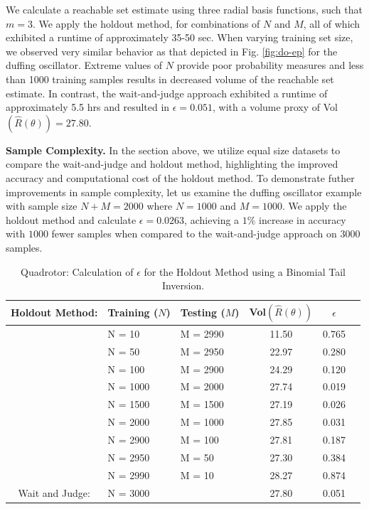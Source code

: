 \documentclass[letterpaper, 10 pt, conference]{ieeeconf}  %
\begin{document}
We calculate a reachable set estimate using three radial basis functions, such that $m = 3$. We apply the holdout method, for combinations of $N$ and $M$, all of which exhibited a runtime of approximately 35-50 sec. When varying training set size, we observed very similar behavior as that depicted in Fig. \ref{fig:do-ep} for the duffing oscillator. Extreme values of $N$ provide poor probability measures and less than 1000 training samples results in decreased volume of the reachable set estimate. In contrast, the wait-and-judge approach exhibited a runtime of approximately 5.5 hrs and resulted in $\epsilon = 0.051$, with a volume proxy of Vol$(\hat{R}(\theta)) = 27.80$.  

\textbf{Sample Complexity.} In the section above, we utilize equal size datasets to compare the wait-and-judge and holdout method, highlighting the improved accuracy and computational cost of the holdout method. To demonstrate futher improvements in sample complexity, let us examine the duffing oscillator example with sample size $N+M = 2000$ where $N=1000$ and $M=1000$. We apply the holdout method and calculate $\epsilon = 0.0263$, achieving a $1\%$ increase in accuracy with $1000$ fewer samples when compared to the wait-and-judge approach on $3000$ samples.

\begin{table}[H]\centering
\caption{\normalfont \small Quadrotor: Calculation of $\epsilon$ for the Holdout Method using a Binomial Tail Inversion. 
}
\begin{tabular}{@{}cllccc@{}}
\toprule
Holdout Method:& Training ($N$) & Testing ($M$) & Vol$(\hat{R}(\theta))$ & $\epsilon$  \\ \midrule \midrule
& N = 10 & M = 2990 & 11.50 & 0.765  \\
& N = 50 & M = 2950 & 22.97 & 0.280  \\ 
& N = 100 & M = 2900 & 24.29 & 0.120  \\ 
& N = 1000 & M = 2000 & 27.74 & 0.019  \\ 
& N = 1500 & M = 1500 & 27.19 & 0.026 \\ 
& N = 2000 & M = 1000 & 27.85 & 0.031 \\ 
& N = 2900 & M = 100 & 27.81 & 0.187 \\ 
& N = 2950 & M = 50 & 27.30 & 0.384 \\
& N = 2990 & M = 10 & 28.27 & 0.874 \\ 
\midrule \midrule
Wait and Judge: & N = 3000 &  & 27.80 & 0.051  \\ 
\bottomrule
\end{tabular}
\label{table:quad-rbf}
\end{table}
\end{document}
